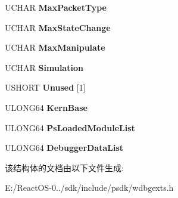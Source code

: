 \begin{DoxyCompactItemize}
U\+C\+H\+AR {\bfseries Max\+Packet\+Type}
\item 
\mbox{\label{struct___d_b_g_k_d___g_e_t___v_e_r_s_i_o_n64_a1dcc66a7cc9d36542273bddbcd67cab3}} 
U\+C\+H\+AR {\bfseries Max\+State\+Change}
\item 
\mbox{\label{struct___d_b_g_k_d___g_e_t___v_e_r_s_i_o_n64_aa25e422abaa6522bfc9466bb23e9875a}} 
U\+C\+H\+AR {\bfseries Max\+Manipulate}
\item 
\mbox{\label{struct___d_b_g_k_d___g_e_t___v_e_r_s_i_o_n64_aec6998862da61222860c6509f0ffe7ae}} 
U\+C\+H\+AR {\bfseries Simulation}
\item 
\mbox{\label{struct___d_b_g_k_d___g_e_t___v_e_r_s_i_o_n64_a879abf158af7a6fd88df4c64e2ab4ee4}} 
U\+S\+H\+O\+RT {\bfseries Unused} \mbox{[}1\mbox{]}
\item 
\mbox{\label{struct___d_b_g_k_d___g_e_t___v_e_r_s_i_o_n64_a391e35b4ac2f147e0e93ca6187dfa861}} 
U\+L\+O\+N\+G64 {\bfseries Kern\+Base}
\item 
\mbox{\label{struct___d_b_g_k_d___g_e_t___v_e_r_s_i_o_n64_a341d391a36680dd97b17115da42ec086}} 
U\+L\+O\+N\+G64 {\bfseries Ps\+Loaded\+Module\+List}
\item 
\mbox{\label{struct___d_b_g_k_d___g_e_t___v_e_r_s_i_o_n64_a3197d1d5afc7c7116d1d03142e636528}} 
U\+L\+O\+N\+G64 {\bfseries Debugger\+Data\+List}
\end{DoxyCompactItemize}


该结构体的文档由以下文件生成\+:\begin{DoxyCompactItemize}
\item 
E\+:/\+React\+O\+S-\/0../sdk/include/psdk/wdbgexts.\+h\end{DoxyCompactItemize}
